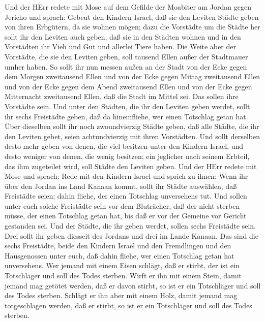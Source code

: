  Und der HErr redete mit Mose auf dem Gefilde der Moabiter
am Jordan gegen Jericho und sprach:  Gebeut den Kindern
Israel, daß sie den Leviten Städte geben von ihren Erbgütern, da sie
wohnen mögen;  dazu die Vorstädte um die Städte her sollt
ihr den Leviten auch geben, daß sie in den Städten wohnen und in den
Vorstädten ihr Vieh und Gut und allerlei Tiere haben.  Die
Weite aber der Vorstädte, die sie den Leviten geben, soll tausend Ellen
außer der Stadtmauer umher haben.  So sollt ihr nun messen
außen an der Stadt von der Ecke gegen dem Morgen zweitausend Ellen und
von der Ecke gegen Mittag zweitausend Ellen und von der Ecke gegen dem
Abend zweitausend Ellen und von der Ecke gegen Mitternacht zweitausend
Ellen, daß die Stadt im Mittel sei. Das sollen ihre Vorstädte sein.
 Und unter den Städten, die ihr den Leviten geben werdet,
sollt ihr sechs Freistädte geben, daß da hineinfliehe, wer einen
Totschlag getan hat. Über dieselben sollt ihr noch zwoundvierzig Städte
geben,  daß alle Städte, die ihr den Leviten gebet, seien
achtundvierzig mit ihren Vorstädten.  Und sollt derselben
desto mehr geben von denen, die viel besitzen unter den Kindern Israel,
und desto weniger von denen, die wenig besitzen; ein jeglicher nach
seinem Erbteil, das ihm zugeteilet wird, soll Städte den Leviten geben.
 Und der HErr redete mit Mose und sprach:  Rede
mit den Kindern Israel und sprich zu ihnen: Wenn ihr über den Jordan ins
Land Kanaan kommt,  sollt ihr Städte auswählen, daß
Freistädte seien; dahin fliehe, der einen Totschlag unversehens tut.
 Und sollen unter euch solche Freistädte sein vor dem
Bluträcher, daß der nicht sterben müsse, der einen Totschlag getan hat,
bis daß er vor der Gemeine vor Gericht gestanden sei.  Und
der Städte, die ihr geben werdet, sollen sechs Freistädte sein.
 Drei sollt ihr geben diesseit des Jordans und drei im
Lande Kanaan.  Das sind die sechs Freistädte, beide den
Kindern Israel und den Fremdlingen und den Hausgenossen unter euch, daß
dahin fliehe, wer einen Totschlag getan hat unversehens. 
Wer jemand mit einem Eisen schlägt, daß er stirbt, der ist ein
Totschläger und soll des Todes sterben.  Wirft er ihn mit
einem Stein, damit jemand mag getötet werden, daß er davon stirbt, so
ist er ein Totschläger und soll des Todes sterben.  Schlägt
er ihn aber mit einem Holz, damit jemand mag totgeschlagen werden, daß
er stirbt, so ist er ein Totschläger und soll des Todes sterben.
